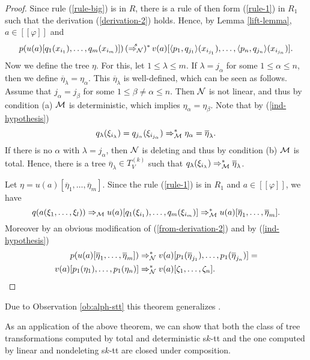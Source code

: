 \documentclass[10pt]{scrartcl}
\newcommand{\seml}{[\![}
\newcommand{\semr}{]\!]}
\newcommand{\M}{{\cal M}}
\newcommand{\N}{{\cal N}}
\def\ui#1{^{(#1)}}
\begin{document}
\begin{proof}
Since rule (\ref{rule-big}) is in $R$, there is a rule of then form (\ref{rule-1}) in $R_1$ such that the derivation (\ref{derivation-2}) holds. Hence, by Lemma \ref{lift-lemma}, $a\in \seml\varphi \semr$ and
\begin{equation}\label{from-derivation-2}
p(u(a)[q_1(x_{i_1}),\ldots,q_m(x_{i_m})]) \,
(\stackrel{s}{\Rightarrow_{\N}})^* \, v(a)[\langle p_1, q_{j_1}\rangle (x_{i_{j_1}}),\ldots,\langle p_n, q_{j_n}\rangle (x_{i_{j_n}})].
\end{equation}
Now we define the tree $\eta$. For this, let $1\le \lambda \le m$. If $\lambda = j_\alpha$ for some
$1\le \alpha \le n$, then we define $\overline{\eta}_\lambda = \eta_\alpha$. This $\overline{\eta}_\lambda$ is well-defined, which can be seen as follows. Assume that $j_\alpha=j_\beta$
for some $1\le \beta\neq \alpha \le n$.  Then $\N$ is not linear, and thus by condition (a)  $\M$ is deterministic, which implies $\eta_\alpha=\eta_\beta$.
Note that by (\ref{ind-hypothesis})
\[q_\lambda(\xi_{i_\lambda})= q_{j_\alpha}(\xi_{i_{j_\alpha}})\Rightarrow_{\M}^* \eta_\alpha=\overline{\eta}_\lambda.\]
If there is no $\alpha$ with $\lambda = j_\alpha$, then $\N$ is deleting and thus by condition (b) $\M$ is total.
Hence, there is a tree $\overline{\eta}_\lambda\in T_V\ui k$ such that $q_\lambda(\xi_{i_\lambda})
\Rightarrow_{\M}^* \overline{\eta}_\lambda$. 

Let $\eta=u(a)[\overline{\eta}_1,\ldots,\overline{\eta}_m]$. Since the rule (\ref{rule-1}) is in $R_1$ and $a\in \seml\varphi \semr$, we have
\[
q(a(\xi_1,\ldots,\xi_l)) \Rightarrow_{\M} u(a)[q_1(\xi_{i_1}),\ldots,q_m(\xi_{i_m})] \Rightarrow^*_{\M}u(a)[\overline{\eta}_1,\ldots,\overline{\eta}_m].
\]
Moreover by an obvious modification of (\ref{from-derivation-2}) and by (\ref{ind-hypothesis})
\begin{align*}
p(u(a)[\overline{\eta}_1,\ldots,\overline{\eta}_m])& \Rightarrow^*_{\N} v(a)[p_1(\overline{\eta}_{j_1}),\dots,p_1(\overline{\eta}_{j_n})] = \\
v(a)[p_1(\eta_1),\dots,p_1(\eta_n)] & \Rightarrow^*_{\N}v(a)[\zeta_1,\ldots,\zeta_n].
\end{align*}
\end{proof}

Due to Observation \ref{ob:alph-stt} this theorem generalizes \cite[Thm.1]{bak79}.

As an application of the above theorem, we can show that both the class of tree transformations computed by total and deterministic s$k$-tt and the one computed by linear and nondeleting s$k$-tt are closed under composition.
\end{document}
